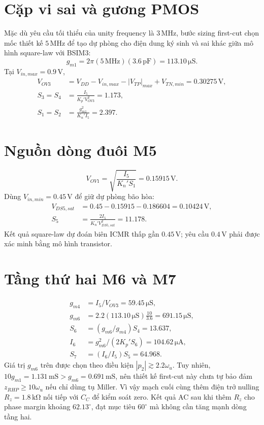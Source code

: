 \documentclass[11pt,a4paper]{report}
\newcommand{\SI}[2]{\ensuremath{#1\,\mathrm{#2}}}
\newcommand{\ang}[1]{\ensuremath{#1^{\circ}}}
\newcommand{\micro}{\mu}\newcommand{\dd}{\mathrm d}\newcommand{\ohm}{\Omega}
\begin{document}
\section{Cặp vi sai và gương PMOS}
Mặc dù yêu cầu tối thiểu của unity frequency là \SI{3}{MHz}, bước sizing
first-cut chọn mốc thiết kế \SI{5}{MHz} để tạo dự phòng cho điện dung ký sinh
và sai khác giữa mô hình square-law với BSIM3:
\begin{equation}g_{m1}=2\pi(\SI{5}{MHz})(\SI{3.6}{pF})=\boxed{\SI{113.10}{\micro S}}.\end{equation}
Tại $V_{in,max}=\SI{0.9}{V}$,
\begin{align}V_{OV3}&=V_{DD}-V_{in,max}-|V_{TP}|_{max}+V_{TN,min}=\SI{0.30275}{V},\\
S_3=S_4&=\frac{I_5}{K_p'V_{OV3}^2}=\boxed{1.173},\\
S_1=S_2&=\frac{g_{m1}^2}{K_n'I_5}=\boxed{2.397}.
\end{align}

\section{Nguồn dòng đuôi M5}
\begin{equation}V_{OV1}=\sqrt{\frac{I_5}{K_n'S_1}}=\SI{0.15915}{V}.\end{equation}
Dùng $V_{in,min}=\SI{0.45}{V}$ để giữ dự phòng bão hòa:
\begin{align}V_{DS5,sat}&=0.45-0.15915-0.186604=\SI{0.10424}{V},\\
S_5&=\frac{2I_5}{K_n'V_{DS5,sat}^2}=\boxed{11.178}.
\end{align}
Kết quả square-law dự đoán biên ICMR thấp gần \SI{0.45}{V}; yêu cầu \SI{0.4}{V} phải được xác minh bằng mô hình transistor.

\section{Tầng thứ hai M6 và M7}
\begin{align}g_{m4}&=I_5/V_{OV3}=\SI{59.45}{\micro S},\\
g_{m6}&=2.2(\SI{113.10}{\micro S})\frac{10}{3.6}=\SI{691.15}{\micro S},\\
S_6&=(g_{m6}/g_{m4})S_4=13.637,\\
I_6&=g_{m6}^2/(2K_p'S_6)=\SI{104.62}{\micro A},\\
S_7&=(I_6/I_5)S_5=64.968.
\end{align}
Giá trị $g_{m6}$ trên được chọn theo điều kiện
$|p_2|\gtrsim2.2\omega_u$. Tuy nhiên,
$10g_{m1}=\SI{1.131}{mS}>g_{m6}=\SI{0.691}{mS}$, nên thiết kế first-cut này
chưa tự bảo đảm $z_{RHP}\ge10\omega_u$ nếu chỉ dùng tụ Miller. Vì vậy mạch cuối
cùng thêm điện trở nulling $R_z=\SI{1.8}{k\ohm}$ nối tiếp với $C_C$ để kiểm soát
zero. Kết quả AC sau khi thêm $R_z$ cho phase margin khoảng \ang{62.13}, đạt
mục tiêu \ang{60} mà không cần tăng mạnh dòng tầng hai.
\end{document}
